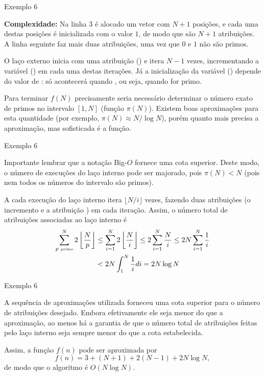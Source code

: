\begin{frame}[fragile]{Exemplo 6}

    \textbf{Complexidade:} Na linha 3 é alocado um vetor com $N + 1$ posições, e cada uma
        destas posições é inicializada com o valor $1$, de modo que são $N + 1$ atribuições. A
        linha seguinte faz mais duas atribuições, uma vez que $0$ e $1$ não são primos.

        O laço externo inicia com uma atribuição () e itera $N - 1$ vezes,
        incrementando a variável  () em cada uma destas iterações. Já
        a inicialização da variável  () depende do valor de 
        : só acontecerá quando , ou seja, quando 
        for primo.

        Para terminar $f(N)$ precisamente seria necessário determinar o número exato de primos no
        intervalo $[1, N]$ (função $\pi(N)$). Existem boas aproximações para esta quantidade 
        (por exemplo,
            $\pi(N) \approx N/\log N$), porém quanto mais precisa a aproximação, mas sofisticada é a
            função.
\end{frame}

\begin{frame}[fragile]{Exemplo 6}

    Importante lembrar que a notação Big-$O$ fornece uma cota superior.
    Deste modo, o número de execuções do laço interno pode ser majorado, pois $\pi(N) < N$ 
    (pois nem todos os números do intervalo são primos).

    A cada execução do laço interno itera $\lfloor N/i\rfloor$ vezes, fazendo duas atribuições
    (o incremento  e a atribuição ) em cada iteração. Assim,
    o número total de atribuições associadas ao laço interno é
    \begin{align*}
        \sum_{p\ \mbox{\tiny primo} }^N 2\left\lfloor \frac{N}{p}\right\rfloor 
        &\leq  \sum_{i = 1}^N 2\left\lfloor \frac{N}{i}\right\rfloor 
        \leq  2\sum_{i = 1}^N \frac{N}{i}  \leq  2N\sum_{i = 1}^N \frac{1}{i} \\
        &<  2N\int_1^N \frac{1}{i} di = 2N\log N
    \end{align*}
\end{frame}

\begin{frame}[fragile]{Exemplo 6}

    A sequência de aproximações utilizada forneceu uma cota superior para o número de atribuições
    desejado. Embora efetivamente ele seja menor do que a aproximação, ao menos há a garantia
    de que o número total de atribuições feitas pelo laço interno seja sempre menor do que a 
    cota estabelecida.

    Assim, a função $f(n)$ pode ser aproximada por
    \[
        f(n) = 3 + (N + 1) + 2(N - 1) + 2N\log N,
    \]
    de modo que o algoritmo é $O(N\log N)$.

\end{frame}

